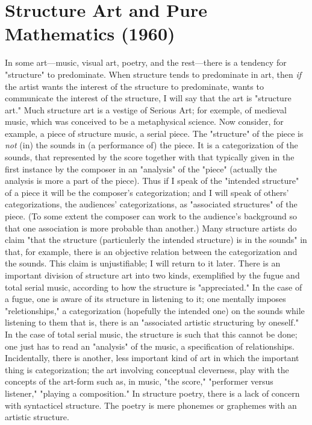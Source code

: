 \chapter[Structure Art and Pure Mathematics (1960)][Structure Art and Pure Mathematics]{Structure Art and Pure Mathematics (1960)}

In some art---music, visual art, poetry, and the rest---there is a tendency for 
"structure" to predominate. When structure tends to predominate in art, then \emph{if} the 
artist wants the interest of the structure to predominate, wants to communicate the 
interest of the structure, I will say that the art is "structure art." Much structure 
art is a vestige of Serious Art; for exemple, of medieval music, which was conceived 
to be a metaphysical science. Now consider, for example, a piece of structure music, 
a serial piece. The "structure" of the piece is \emph{not} (in) the sounds in (a performance 
of) the piece. It is a categorization of the sounds, that represented by the score 
together with that typically given in the first instance by the composer in an "analysis" 
of the "piece" (actually the analysis is more a part of the piece). Thus if I speak 
of the "intended structure" of a piece it will be the composer's categorization; and I 
will speak of others' categorizations, the audiences' categorizations, as "associated 
structures" of the piece. (To some extent the composer can work to the audience's 
background so that one association is more probable than another.) Many structure 
artists do claim "that the structure (particulerly the intended structure) is in the 
sounds" in that, for example, there is an objective relation between the categorization 
and the sounds. This claim is unjustifiable; I will return to it later. There is an 
important division of structure art into two kinds, exemplified by the fugue and total 
serial music, according to how the structure is "appreciated." In the case of a fugue, 
one is aware of its structure in listening to it; one mentally imposes "reletionships," 
a categorization (hopefully the intended one) on the sounds while listening to them 
that is, there is an "associated artistic structuring by oneself." In the case of total 
serial music, the structure is such that this cannot be done; one just has to read an 
"analysis" of the music, a specification of relationships. Incidentally, there is 
another, less important kind of art in which the important thing is categorization; 
the art involving conceptual cleverness, play with the concepts of the art-form such as, 
in music, "the score," "performer versus listener," "playing a composition." In 
structure poetry, there is a lack of concern with syntacticel structure. The poetry 
is mere phonemes or graphemes with an artistic structure. 

